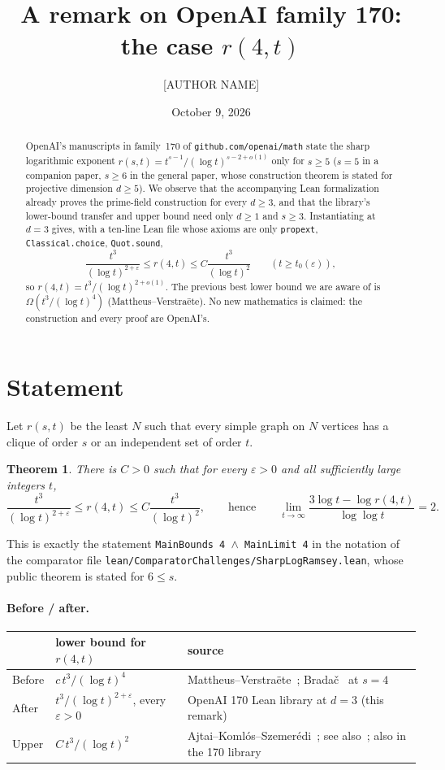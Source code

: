 \documentclass[11pt]{amsart}
\title{A remark on OpenAI family 170: the case $r(4,t)$}
\author{[AUTHOR NAME]}
\date{October 9, 2026}
\newtheorem{theorem}{Theorem}
\theoremstyle{remark}
\begin{document}
\begin{abstract}
OpenAI's manuscripts in family~170 of \texttt{github.com/openai/math}
state the sharp logarithmic exponent
$r(s,t)=t^{s-1}/(\log t)^{s-2+o(1)}$ only for $s\ge5$
($s=5$ in a companion paper, $s\ge6$ in the general paper, whose
construction theorem is stated for projective dimension $d\ge5$).
We observe that the accompanying Lean formalization already proves the
prime-field construction for every $d\ge3$, and that the library's
lower-bound transfer and upper bound need only $d\ge1$ and $s\ge3$.
Instantiating at $d=3$ gives, with a ten-line Lean file whose axioms are
only \texttt{propext}, \texttt{Classical.choice}, \texttt{Quot.sound},
\[
\frac{t^3}{(\log t)^{2+\varepsilon}}\le r(4,t)\le C\frac{t^3}{(\log t)^2}
\qquad(t\ge t_0(\varepsilon)),
\]
so $r(4,t)=t^3/(\log t)^{2+o(1)}$. The previous best lower bound we are
aware of is $\Omega(t^3/(\log t)^4)$ (Mattheus--Verstra\"ete). No new
mathematics is claimed: the construction and every proof are OpenAI's.
\end{abstract}
\maketitle

\section{Statement}
Let $r(s,t)$ be the least $N$ such that every simple graph on $N$
vertices has a clique of order $s$ or an independent set of order $t$.

\begin{theorem}\label{thm:main}
There is $C>0$ such that for every $\varepsilon>0$ and all sufficiently
large integers $t$,
\[
\frac{t^3}{(\log t)^{2+\varepsilon}}\le r(4,t)\le C\frac{t^3}{(\log t)^2},
\qquad\text{hence}\qquad
\lim_{t\to\infty}\frac{3\log t-\log r(4,t)}{\log\log t}=2 .
\]
\end{theorem}

This is exactly the statement \texttt{MainBounds 4 $\wedge$ MainLimit 4}
in the notation of the comparator file
\texttt{lean/ComparatorChallenges/SharpLogRamsey.lean}, whose public
theorem is stated for $6\le s$.

\paragraph{Before / after.}
\begin{center}
\small\begin{tabular}{lp{}p{}}
 & lower bound for $r(4,t)$ & source\\\hline
Before & $c\,t^3/(\log t)^4$ & Mattheus--Verstra\"ete~\cite{MV}; Brada\v{c}~\cite{Bradac} at $s=4$\\
After & $t^3/(\log t)^{2+\varepsilon}$, every $\varepsilon>0$ & OpenAI 170 Lean library at $d=3$ (this remark)\\
Upper & $C\,t^3/(\log t)^2$ & Ajtai--Koml\'os--Szemer\'edi~\cite{AKS}; see also~\cite{LRZ}; also in the 170 library
\end{tabular}
\end{center}
\end{document}
